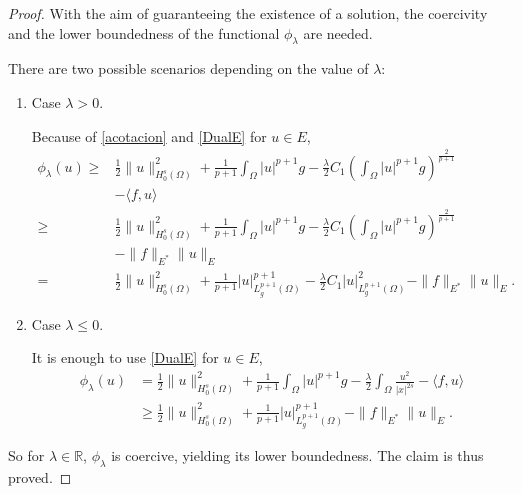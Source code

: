 \documentclass[preprint,12pt]{elsarticle}
\begin{document}
		\begin{proof}
			With the aim of guaranteeing the existence of a solution,  the coercivity and the lower boundedness of the functional $\phi_{\lambda}$ are needed.\par
			There are two possible scenarios depending on the value of $\lambda$:
			\begin{enumerate}
				\item[a)] Case $\lambda>0$.\par 
				Because of \eqref{acotacion} and \eqref{DualE} for $u\in E$, 
				\begin{align*}
					\phi_{\lambda} (u)\geq&  \frac{1}{2}\|u\|^2_{H^s_0(\Omega)}+\frac{1}{p+1}\int_{\Omega}|u|^{p+1}g-\frac{\lambda}{2}C_1\left(\int_{\Omega}|u|^{p+1}g\right)^{\frac{2}{p+1}}\\&-\langle f,u\rangle\\
					\geq& \frac{1}{2}\|u\|^2_{H^s_0(\Omega)}+\frac{1}{p+1}\int_{\Omega}|u|^{p+1}g-\frac{\lambda}{2} C_1\left(\int_{\Omega}|u|^{p+1}g\right)^{\frac{2}{p+1}}\\&-\| f\|_{E^*}\|u\|_{E}\\
					=&\frac{1}{2}\|u\|^2_{H^s_0(\Omega)}+\frac{1}{p+1}|u|^{p+1}_{L^{p+1}_g(\Omega)}-\frac{\lambda}{2}C_1|u|^2_{L^{p+1}_g(\Omega)}-\| f\|_{E^*}\|u\|_{E}.
				\end{align*}
				
				\item[b)] Case $\lambda\leq 0$.\par 
				It is enough to use \eqref{DualE} for $u\in E$, 
				\begin{align*}
					\phi_{\lambda} (u)&= \frac{1}{2}\|u\|^2_{H^s_0(\Omega)}+\frac{1}{p+1}\int_{\Omega}|u|^{p+1}g-\frac{\lambda}{2} \int_{\Omega}\frac{u^2}{|x|^{2s}}-\langle f,u\rangle\\
					&\geq \frac{1}{2}\|u\|^2_{H^s_0(\Omega)}+\frac{1}{p+1}|u|^{p+1}_{L^{p+1}_g(\Omega)}-\| f\|_{E^*}\|u\|_{E}.
				\end{align*}
			\end{enumerate}
			So for $\lambda\in \mathbb{R}$, $\phi_{\lambda}$ is coercive, yielding its lower boundedness. The claim is thus proved.
			

\end{proof}
\end{document}
